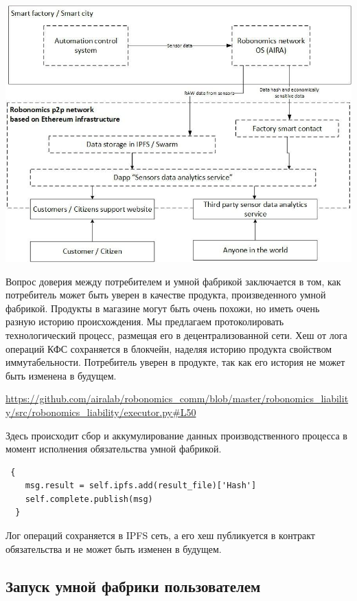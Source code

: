 \documentclass{article}
\begin{document}
\includegraphics[width=1\textwidth]{app-1.png} 

Вопрос доверия между потребителем и умной фабрикой заключается в том, как потребитель может быть уверен в качестве продукта, произведенного умной фабрикой. Продукты в магазине могут быть очень похожи, но иметь очень разную историю происхождения. Мы предлагаем протоколировать технологический процесс, размещая его в децентрализованной сети. Хеш от лога операций КФС сохраняется в блокчейн, наделяя историю продукта свойством иммутабельности. Потребитель уверен в продукте, так как его история не может быть изменена в будущем. 

\url{https://github.com/airalab/robonomics_comm/blob/master/robonomics_liability/src/robonomics_liability/executor.py#L50}

Здесь происходит сбор и аккумулирование данных производственного процесса в момент исполнения обязательства умной фабрикой.


\begin{lstlisting}
 {
	msg.result = self.ipfs.add(result_file)['Hash']
	self.complete.publish(msg)
  }
\end{lstlisting}


Лог операций сохраняется в IPFS сеть, а его хеш публикуется в контракт обязательства и не может быть изменен в будущем.

\subsection{Запуск умной фабрики пользователем}
\end{document}
